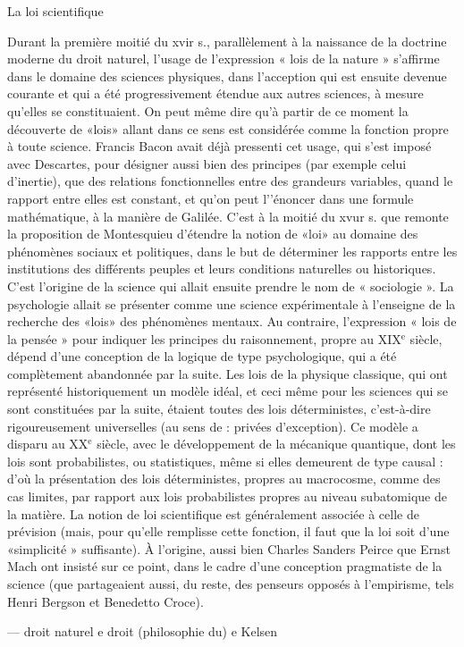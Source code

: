 La loi scientifique

Durant la première moitié du xvir s.,
parallèlement à la naissance de la doctrine moderne du droit naturel, l'usage de
l'expression « lois de la nature » s’affirme
dans le domaine des sciences physiques,
dans l’acception qui est ensuite devenue
courante et qui a été progressivement
étendue aux autres sciences, à mesure
qu'elles se constituaient. On peut même
dire qu’à partir de ce moment la découverte de «lois» allant dans ce sens est
considérée comme la fonction propre à
toute science. Francis Bacon avait déjà
pressenti cet usage, qui s’est imposé avec
Descartes, pour désigner aussi bien des
principes (par exemple celui d'inertie),
que des relations fonctionnelles entre des
grandeurs variables, quand le rapport
entre elles est constant, et qu'on peut
l’'énoncer dans une formule mathématique, à la manière de Galilée. C’est à la
moitié du xvur s. que remonte la proposition de Montesquieu d'étendre la notion
de «loi» au domaine des phénomènes
sociaux et politiques, dans le but de
déterminer les rapports entre les institutions des différents peuples et leurs conditions naturelles ou historiques. C'est
l’origine de la science qui allait ensuite
prendre le nom de « sociologie ». La psychologie allait se présenter comme une
science expérimentale à l’enseigne de la
recherche des «lois» des phénomènes
mentaux. Au contraire, l'expression « lois
de la pensée » pour indiquer les principes
du raisonnement, propre au {\footnotesize XIX}$^\text{e}$ siècle,
dépend d’une conception de la logique de
type psychologique, qui a été complètement abandonnée par la suite. Les lois de
la physique classique, qui ont représenté
historiquement un modèle idéal, et ceci
%
même pour les sciences qui se sont constituées par la suite, étaient toutes des lois
déterministes, c’est-à-dire rigoureusement
universelles (au sens de : privées d’exception). Ce modèle a disparu au {\footnotesize XX}$^\text{e}$ siècle, avec
le développement de la mécanique quantique, dont les lois sont probabilistes, ou
statistiques, même si elles demeurent de
type causal : d’où la présentation des lois
déterministes, propres au macrocosme,
comme des cas limites, par rapport aux
lois probabilistes propres au niveau subatomique de la matière. La notion de loi
scientifique est généralement associée à
celle de prévision (mais, pour qu’elle remplisse cette fonction, il faut que la loi soit
d’une «simplicité » suffisante). À l’origine, aussi bien Charles Sanders Peirce
que Ernst Mach ont insisté sur ce point,
dans le cadre d’une conception pragmatiste de la science (que partageaient aussi,
du reste, des penseurs opposés à l’empirisme, tels Henri Bergson et Benedetto
Croce).

 

— droit naturel e droit (philosophie
du) e Kelsen

